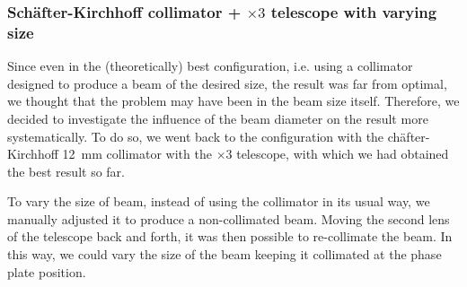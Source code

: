 \subsubsection{Schäfter-Kirchhoff collimator + $\times 3$ telescope with varying size}

Since even in the (theoretically) best configuration, i.e. using a collimator designed to produce a beam of the desired size, the result was far from optimal, we thought that the problem may have been in the beam size itself. Therefore, we decided to investigate the influence of the beam diameter on the result more systematically. To do so, we went back to the configuration with the chäfter-Kirchhoff \SI{12}{mm} collimator with the $\times3$ telescope, with which we had obtained the best result so far.

To vary the size of beam, instead of using the collimator in its usual way, we manually adjusted it to produce a non-collimated beam. Moving the second lens of the telescope back and forth, it was then possible to re-collimate the beam. In this way, we could vary the size of the beam keeping it collimated at the phase plate  position.


